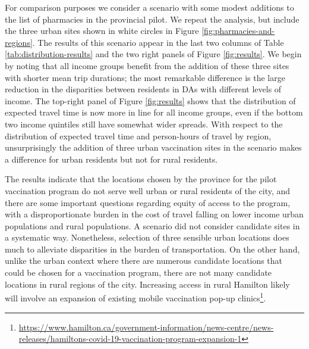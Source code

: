 \documentclass[]{elsarticle} %
\begin{document}
For comparison purposes we consider a scenario with some modest
additions to the list of pharmacies in the provincial pilot. We repeat
the analysis, but include the three urban sites shown in white circles
in Figure \ref{fig:pharmacies-and-regions}. The results of this scenario
appear in the last two columns of Table \ref{tab:distribution-results}
and the two right panels of Figure \ref{fig:results}. We begin by noting
that all income groups benefit from the addition of these three sites
with shorter mean trip durations; the most remarkable difference is the
large reduction in the disparities between residents in DAs with
different levels of income. The top-right panel of Figure
\ref{fig:results} shows that the distribution of expected travel time is
now more in line for all income groups, even if the bottom two income
quintiles still have somewhat wider spreads. With respect to the
distribution of expected travel time and person-hours of travel by
region, unsurprisingly the addition of three urban vaccination sites in
the scenario makes a difference for urban residents but not for rural
residents.

The results indicate that the locations chosen by the province for the
pilot vaccination program do not serve well urban or rural residents of
the city, and there are some important questions regarding equity of
access to the program, with a disproportionate burden in the cost of
travel falling on lower income urban populations and rural populations.
A scenario did not consider candidate sites in a systematic way.
Nonetheless, selection of three sensible urban locations does much to
alleviate disparities in the burden of transportation. On the other
hand, unlike the urban context where there are numerous candidate
locations that could be chosen for a vaccination program, there are not
many candidate locations in rural regions of the city. Increasing access
in rural Hamilton likely will involve an expansion of existing mobile
vaccination pop-up
clinics\footnote{\url{https://www.hamilton.ca/government-information/news-centre/news-releases/hamiltons-covid-19-vaccination-program-expansion-1}}.
\end{document}
